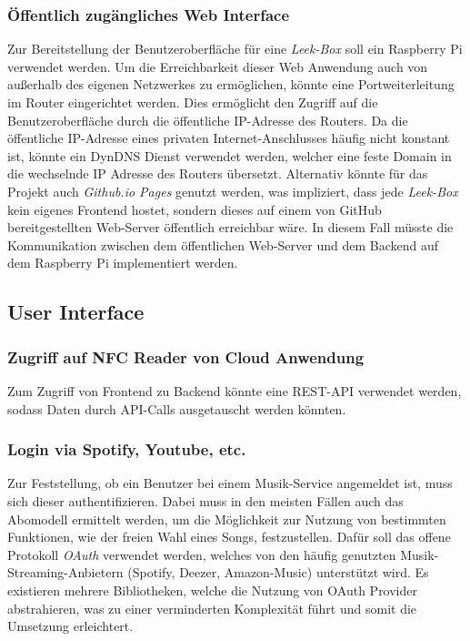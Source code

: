 \documentclass[10pt, a4paper]{article}
\begin{document}
\begin{onehalfspace}
\subsubsection*{Öffentlich zugängliches Web Interface}
Zur Bereitstellung der Benutzeroberfläche für eine \textit{Leek-Box} soll ein Raspberry Pi verwendet werden.
Um die Erreichbarkeit dieser Web Anwendung auch von außerhalb des eigenen Netzwerkes zu ermöglichen, könnte eine Portweiterleitung im Router eingerichtet werden.
Dies ermöglicht den Zugriff auf die Benutzeroberfläche durch die öffentliche IP-Adresse des Routers.
Da die öffentliche IP-Adresse eines privaten Internet-Anschlusses häufig nicht konstant ist, könnte ein DynDNS Dienst verwendet werden, welcher eine feste Domain in die wechselnde IP Adresse des Routers übersetzt.
Alternativ könnte für das Projekt auch \textit{Github.io Pages} genutzt werden, was impliziert, dass jede \textit{Leek-Box} kein eigenes Frontend hostet, sondern dieses auf einem von GitHub bereitgestellten Web-Server öffentlich erreichbar wäre. In diesem Fall müsste die Kommunikation zwischen dem öffentlichen Web-Server und dem Backend auf dem Raspberry Pi implementiert werden.

\subsection{User Interface}
\subsubsection*{Zugriff auf NFC Reader von Cloud Anwendung}
Zum Zugriff von Frontend zu Backend könnte eine REST-API verwendet werden, sodass Daten durch API-Calls ausgetauscht werden könnten.

\subsubsection*{Login via Spotify, Youtube, etc.}
Zur Feststellung, ob ein Benutzer bei einem Musik-Service angemeldet ist, muss sich dieser authentifizieren. Dabei muss in den meisten Fällen auch das Abomodell ermittelt werden, um die Möglichkeit zur Nutzung von bestimmten Funktionen, wie der freien Wahl eines Songs, festzustellen. Dafür soll das offene Protokoll \textit{OAuth} verwendet werden, welches von den häufig genutzten Musik-Streaming-Anbietern (Spotify, Deezer, Amazon-Music) unterstützt wird.
Es existieren mehrere Bibliotheken, welche die Nutzung von OAuth Provider abstrahieren, was zu einer verminderten Komplexität führt und somit die Umsetzung erleichtert.


\end{onehalfspace}
\end{document}
